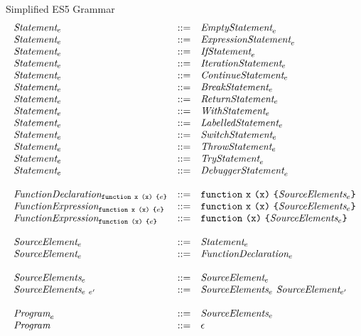 \documentclass[preprint,10pt]{sigplanconf}
\begin{document}
\begin{displayfigure*}{\label{fig:grammar}Simplified ES5 Grammar}
\[\begin{array}{lcl}
  \textit{Statement}_{e} &::=& \textit{EmptyStatement}_{e}
  \\
  \textit{Statement}_{e} &::=& \textit{ExpressionStatement}_{e}
  \\
  \textit{Statement}_{e} &::=& \textit{IfStatement}_{e}
  \\
  \textit{Statement}_{e} &::=& \textit{IterationStatement}_{e}
  \\
  \textit{Statement}_{e} &::=& \textit{ContinueStatement}_{e}
  \\
  \textit{Statement}_{e} &::=& \textit{BreakStatement}_{e}
  \\
  \textit{Statement}_{e} &::=& \textit{ReturnStatement}_{e}
  \\
  \textit{Statement}_{e} &::=& \textit{WithStatement}_{e}
  \\
  \textit{Statement}_{e} &::=& \textit{LabelledStatement}_{e}
  \\
  \textit{Statement}_{e} &::=& \textit{SwitchStatement}_{e}
  \\
  \textit{Statement}_{e} &::=& \textit{ThrowStatement}_{e}
  \\
  \textit{Statement}_{e} &::=& \textit{TryStatement}_{e}
  \\
  \textit{Statement}_{e} &::=& \textit{DebuggerStatement}_{e}
  \\ \\
  \textit{FunctionDeclaration}_{\texttt{function}~\texttt{x}~\texttt{(}\texttt{x}\texttt{)}~\texttt{\{}e\texttt{\}}} 
  &::=&
  \texttt{function}~\texttt{x}~\texttt{(}\texttt{x}\texttt{)}~
  \texttt{\{}\textit{SourceElements}_{e}\texttt{\}}
  \\
  \textit{FunctionExpression}_{\texttt{function}~\texttt{x}~\texttt{(}\texttt{x}\texttt{)}~\texttt{\{}e\texttt{\}}} 
  &::=&
  \texttt{function}~\texttt{x}~\texttt{(}\texttt{x}\texttt{)}~
  \texttt{\{}\textit{SourceElements}_{e}\texttt{\}}
  \\
  \textit{FunctionExpression}_{\texttt{function}~\texttt{(}\texttt{x}\texttt{)}~\texttt{\{}e\texttt{\}}} 
  &::=&
  \texttt{function}~\texttt{(}\texttt{x}\texttt{)}~
  \texttt{\{}\textit{SourceElements}_{e}\texttt{\}}
  \\ \\
  \textit{SourceElement}_{e} &::=& \textit{Statement}_{e} 
  \\
  \textit{SourceElement}_{e} &::=& \textit{FunctionDeclaration}_{e}
  \\ \\

  \textit{SourceElements}_{e} &::=& \textit{SourceElement}_{e}
  \\
  \textit{SourceElements}_{e~e'} &::=& \textit{SourceElements}_{e}~\textit{SourceElement}_{e'}
  \\ \\
  \textit{Program}_{e} &::=& \textit{SourceElements}_{e}
  \\
  \textit{Program}_{} &::=& \epsilon

\end{array}
\]  
\end{displayfigure*}
\end{document}
